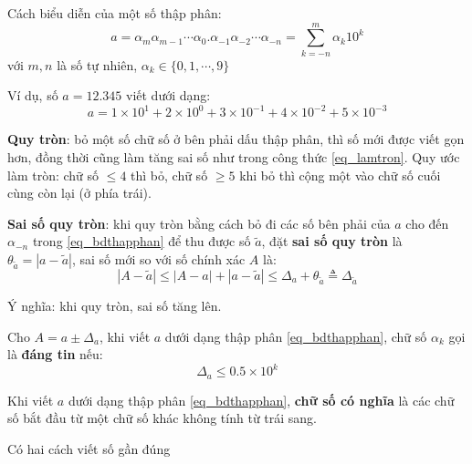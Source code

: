 \documentclass[12pt]{article}
\begin{document}
\newpage{}

Cách biểu diễn của một số thập phân:
\begin{equation}\label{eq_bdthapphan}
a=\alpha_{m}\alpha_{m-1}\cdots\alpha_{0}.\alpha_{-1}\alpha_{-2}\cdots\alpha_{-n} = \sum_{k=-n}^m \alpha_{k}10^k     
\end{equation}
với $m, n$ là số tự nhiên, $\alpha_k \in \{0, 1, \cdots, 9\}$

Ví dụ, số $a=12.345$ viết dưới dạng:
\begin{equation} \label{eq_lamtron}
a = 1 \times 10^1 + 2 \times 10^0 + 3 \times 10^{-1} + 4 \times 10^{-2} + 5 \times 10^{-3} 
\end{equation}

\textbf{Quy tròn}: bỏ một số chữ số ở bên phải dấu thập phân, thì số mới được viết gọn hơn, đồng thời cũng làm tăng sai số như trong công thức \eqref{eq_lamtron}. Quy ước làm tròn: chữ số $\leq 4$ thì bỏ, chữ số $\geq 5$ khi bỏ thì cộng một vào chữ số cuối cùng còn lại (ở phía trái).

\newpage{}

\textbf{Sai số quy tròn}: khi quy tròn bằng cách bỏ đi các số bên phải của $a$ cho đến $\alpha_{-n}$ trong \eqref{eq_bdthapphan} để thu được số $\tilde{a}$, đặt \textbf{sai số quy tròn} là $\theta_{\tilde{a}}=|a - \tilde{a}|$, sai số mới so với số chính xác $A$ là:
\begin{equation}
 |A - \tilde{a}| \leq |A - a| + |a - \tilde{a}| \leq \Delta_a + \theta_{\tilde{a}} \triangleq \Delta_{\tilde{a}} 
\end{equation}

Ý nghĩa: khi quy tròn, sai số tăng lên.

Cho $A = a \pm \Delta_a$, khi viết $a$ dưới dạng thập phân \eqref{eq_bdthapphan}, chữ số $\alpha_k$ gọi là \textbf{đáng tin} nếu:
\begin{equation}
\Delta_a \leq 0.5 \times 10^{k} 
\end{equation}

Khi viết $a$ dưới dạng thập phân \eqref{eq_bdthapphan}, \textbf{chữ số có nghĩa} %
là các chữ số bắt đầu từ một chữ số khác không tính từ trái sang.

\newpage{}

Có hai cách viết số gần đúng

\end{document}
